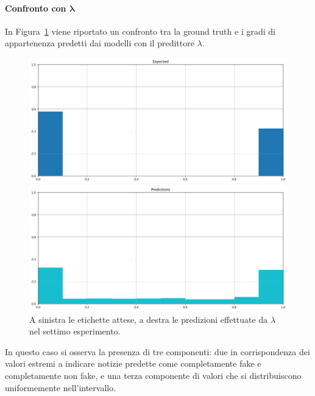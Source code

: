 \documentclass[12pt]{report}
\theoremstyle{definition}
\begin{document}
\paragraph{Confronto con $\bm{\lambda}$}
In Figura~\ref{prediction_exp7} viene riportato un confronto tra la ground truth e i gradi di appartenenza predetti dai modelli con il predittore $\lambda$.
\begin{figure}
\centering
    \begin{minipage}{0.48\textwidth}
        \includegraphics[width=\linewidth]{images/experiment kaggle/expected_memberships.png}
    \end{minipage}
    \begin{minipage}{0.48\textwidth}
        \includegraphics[width=\linewidth]{images/experiment kaggle/prediction_memberships.png}
    \end{minipage}
    \caption{A sinistra le etichette attese, a destra le predizioni effettuate da $\lambda$ nel settimo esperimento.}
    \label{prediction_exp7}
\end{figure} 
In questo caso si osserva la presenza di tre componenti: due in corrispondenza dei valori estremi a indicare notizie predette come completamente fake e completamente non fake, e una terza componente di valori che si distribuiscono uniformemente nell'intervallo.
\end{document}
